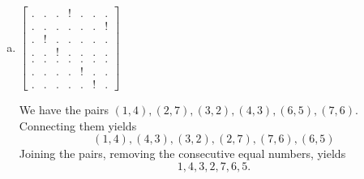 \documentclass[letterpaper]{article}
\begin{document}
\begin{mdframed}
\begin{enumerate}[(a)]
        \item $\begin{bmatrix}
            . & . & . & ! & . & . & . \\ 
            . & . & . & . & . & . & ! \\ 
            . & ! & . & . & . & . & . \\ 
            . & . & ! & . & . & . & . \\ 
            . & . & . & . & . & . & . \\ 
            . & . & . & . & ! & . & . \\ 
            . & . & . & . & . & ! & .
        \end{bmatrix}$
        \begin{mdframed}
            We have the pairs $(1, 4), (2, 7), (3, 2), (4, 3), (6, 5), (7, 6)$. Connecting them yields 
            \[(1, 4), (4, 3), (3, 2), (2, 7), (7, 6), (6, 5)\]
            Joining the pairs, removing the consecutive equal numbers, yields 
            \[1, 4, 3, 2, 7, 6, 5.\]
        \end{mdframed}
    \end{enumerate}
\end{mdframed}
\end{document}

